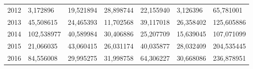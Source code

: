 \begin{table}
\begin{tabular}{p{1cm}p{2cm}p{2cm}p{2cm}p{2cm}p{2cm}p{2cm}}
 2012 &   3,172896 &                             19,521894 &         28,898744 & 22,155940 &                          3,126396 &  65,781001 \\
 2013 &  45,508615 &                             24,465393 &         11,702568 & 39,117018 &                         26,358402 & 125,605886 \\
 2014 & 102,538977 &                             40,589984 &         30,406886 & 25,207709 &                         15,639045 & 107,071099 \\
 2015 &  21,066035 &                             43,060415 &         26,031174 & 40,035877 &                         28,032409 & 204,535445 \\
 2016 &  84,556008 &                             29,995275 &         31,998758 & 64,306227 &                         30,668086 & 236,878951 \\
\bottomrule
\end{tabular}
\end{table}
